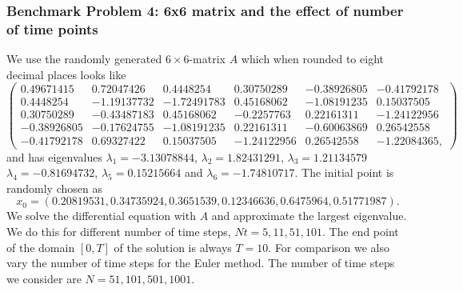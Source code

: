 \subsubsection{Benchmark Problem 4: 6x6 matrix and the effect of number of time points}\label{sec:benchmark problem 4}
We use the randomly generated $6\times 6$-matrix $A$ which when rounded to eight decimal places looks like
\begin{equation}\label{eq:33mat2}
    \left(\begin{array}{cccccc}
        0.49671415 & 0.72047426 & 0.4448254 &  0.30750289 & -0.38926805 & -0.41792178 \\
        0.4448254 & -1.19137732 & -1.72491783 & 0.45168062 & -1.08191235 & 0.15037505 \\
        0.30750289 & -0.43487183 & 0.45168062 & -0.2257763 &  0.22161311 & -1.24122956 \\
        -0.38926805 & -0.17624755 & -1.08191235 & 0.22161311 & -0.60063869 & 0.26542558 \\
        -0.41792178 & 0.69327422 & 0.15037505 & -1.24122956 & 0.26542558 & -1.22084365,
    \end{array}\right)
\end{equation}
and has eigenvalues $\lambda_1 = -3.13078844$, $\lambda_2=1.82431291$, $\lambda_3 = 1.21134579$ $\lambda_4=-0.81694732$,  $\lambda_5=0.15215664$ and $\lambda_6=-1.74810717$. The initial point is randomly chosen as
\begin{equation*}
    x_0 = (0.20819531, 0.34735924, 0.3651539,  0.12346636, 0.6475964,  0.51771987).
\end{equation*}
We solve the differential equation with $A$ and approximate the largest eigenvalue. We do this for different number of time steps, $Nt=5, 11,51,101$. The end point of the domain $[0,T]$ of the solution is always $T=10$. For comparison we also vary the number of time steps for the Euler method. The number of time steps we consider are $N=51,101,501,1001$.
